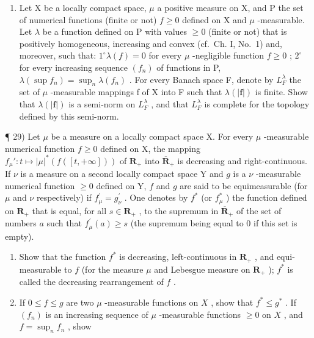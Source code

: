 \begin{enumerate}
\def\labelenumi{\arabic{enumi})}
\setcounter{enumi}{27}
\tightlist
\item
  Let X be a locally compact space, \(\mu\) a positive measure on X, and P the set of numerical functions (finite or not) \(f \geqslant 0\) defined on X and \(\mu\) -measurable. Let \(\lambda\) be a function defined on P with values \(\geqslant 0\) (finite or not) that is positively homogeneous, increasing and convex (cf.~Ch. I, No.~1) and, moreover, such that: \(1^{\circ} \lambda(f) = 0\) for every \(\mu\) -negligible function \(f \geqslant 0\) ; \(2^{\circ}\) for every increasing sequence \((f_{n})\) of functions in P, \(\lambda(\sup f_{n}) = \sup_{n} \lambda(f_{n})\) . For every Banach space F, denote by \(L_{F}^{\lambda}\) the set of \(\mu\) -measurable mappings f of X into F such that \(\lambda(|\mathbf{f}|)\) is finite. Show that \(\lambda(|\mathbf{f}|)\) is a semi-norm on \(L_{F}^{\lambda}\) , and that \(L_{F}^{\lambda}\) is complete for the topology defined by this semi-norm.
\end{enumerate}

¶ 29) Let \(\mu\) be a measure on a locally compact space X. For every \(\mu\) -measurable numerical function \(f \geqslant 0\) defined on X, the mapping \(f_{\mu}' : t \mapsto |\mu|^*(f([t, +\infty]))\) of \(\mathbf{R}_+\) into \(\overline{\mathbf{R}}_{+}\) is decreasing and right-continuous. If \(\nu\) is a measure on a second locally compact space Y and \(g\) is a \(\nu\) -measurable numerical function \(\geqslant 0\) defined on Y, \(f\) and \(g\) are said to be equimeasurable (for \(\mu\) and \(\nu\) respectively) if \(f_{\mu}^{\prime} = g_{\nu}^{\prime}\) . One denotes by \(f^{*}\) (or \(f_{\mu}^{*}\) ) the function defined on \(\mathbf{R}_{+}\) that is equal, for all \(s \in \mathbf{R}_{+}\) , to the supremum in \(\overline{\mathbf{R}}_{+}\) of the set of numbers \(a\) such that \(f_{\mu}^{\prime}(a) \geqslant s\) (the supremum being equal to 0 if this set is empty).

\begin{enumerate}
\def\labelenumi{\alph{enumi})}
\item
  Show that the function \(f^{*}\) is decreasing, left-continuous in \(\mathbf{R}_{+}\) , and equi-measurable to \(f\) (for the measure \(\mu\) and Lebesgue measure on \(\mathbf{R}_{+}\) ); \(f^{*}\) is called the decreasing rearrangement of \(f\) .
\item
  If \(0 \leqslant f \leqslant g\) are two \(\mu\) -measurable functions on \(X\) , show that \(f^* \leqslant g^*\) . If \((f_n)\) is an increasing sequence of \(\mu\) -measurable functions \(\geqslant 0\) on \(X\) , and \(f = \sup_{n} f_n\) , show
\end{enumerate}

